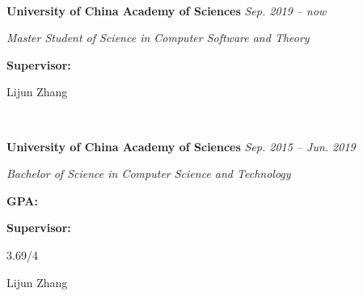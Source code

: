 \documentclass[12pt,a4paper,utf8]{report}
\begin{document}
\vspace{0.2cm}\hspace{0.5cm}\
\begin{minipage}[t]{15.0cm}
    {{\textbf{University of China Academy of Sciences}}}\hfill
    {\em{Sep. 2019 -- now}}\par\vspace{0.1cm}
    {\qquad\em{Master Student of Science in Computer Software and Theory}}\par
\end{minipage}\par
\vspace{0.1cm}
    \begin{minipage}[t]{4cm}
        \qquad \textbf{Supervisor:}\par
    \end{minipage}
    \begin{minipage}[t]{11cm}
        Lijun Zhang\par
    \end{minipage}\par
\vspace{0.4cm}
\vspace{0.2cm}\hspace{0.5cm}\
\begin{minipage}[t]{15.0cm}
    {{\textbf{University of China Academy of Sciences}}}\hfill
    {\em{Sep. 2015 -- Jun. 2019}}\par\vspace{0.1cm}
    {\qquad\em{Bachelor of Science in Computer Science and Technology}}\par
\end{minipage}\par
\vspace{0.1cm}
    \begin{minipage}[t]{4cm}
        \qquad \textbf{GPA:}\par
        \qquad \textbf{Supervisor:}\par
    \end{minipage}
    \begin{minipage}[t]{11cm}
        3.69/4 \par
        Lijun Zhang\par
    \end{minipage}\par
\vspace{0.4cm}
\end{document}
